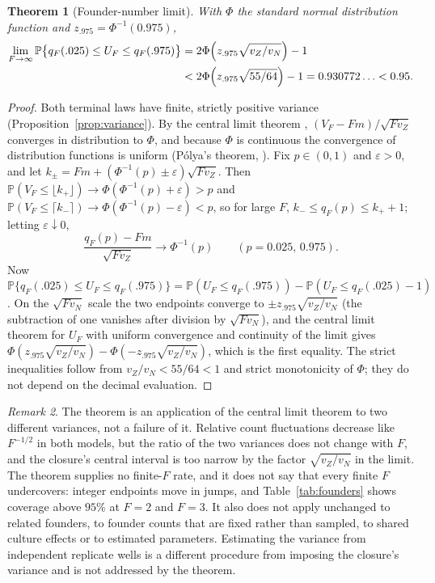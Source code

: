 \documentclass[11pt,a4paper]{article}
\theoremstyle{plain}
\newtheorem{theorem}{Theorem}[section]
\theoremstyle{definition}
\theoremstyle{remark}
\newtheorem{remark}[theorem]{Remark}
\newcommand{\PP}{\mathbb P}
\begin{document}
\begin{theorem}[Founder-number limit]\label{thm:clt}
With $\Phi$ the standard normal distribution function and $z_{.975}=\Phi^{-1}(0.975)$,
\begin{equation}\label{eq:clt}
\begin{aligned}
\lim_{F\to\infty}\PP\bigl\{q_F(.025)\le U_F\le q_F(.975)\bigr\}
&=2\Phi\Bigl(z_{.975}\sqrt{v_Z/v_N}\Bigr)-1\\
&<2\Phi\Bigl(z_{.975}\sqrt{55/64}\Bigr)-1=0.930772\ldots<0.95 .
\end{aligned}
\end{equation}
\end{theorem}
\begin{proof}
Both terminal laws have finite, strictly positive variance (Proposition~\ref{prop:variance}). By the central limit theorem \citep[Chapter~X]{feller1968}, $(V_F-Fm)/\sqrt{Fv_Z}$ converges in distribution to $\Phi$, and because $\Phi$ is continuous the convergence of distribution functions is uniform (P\'olya's theorem, \citealp[Lemma~2.11]{vandervaart1998}). Fix $p\in(0,1)$ and $\varepsilon>0$, and let $k_\pm=Fm+(\Phi^{-1}(p)\pm\varepsilon)\sqrt{Fv_Z}$. Then $\PP(V_F\le\lfloor k_+\rfloor)\to\Phi(\Phi^{-1}(p)+\varepsilon)>p$ and $\PP(V_F\le\lceil k_-\rceil)\to\Phi(\Phi^{-1}(p)-\varepsilon)<p$, so for large $F$, $k_-\le q_F(p)\le k_++1$; letting $\varepsilon\downarrow0$,
\[
\frac{q_F(p)-Fm}{\sqrt{Fv_Z}}\longrightarrow\Phi^{-1}(p)\qquad(p=0.025,\,0.975).
\]
Now $\PP\{q_F(.025)\le U_F\le q_F(.975)\}=\PP(U_F\le q_F(.975))-\PP(U_F\le q_F(.025)-1)$. On the $\sqrt{Fv_N}$ scale the two endpoints converge to $\pm z_{.975}\sqrt{v_Z/v_N}$ (the subtraction of one vanishes after division by $\sqrt{Fv_N}$), and the central limit theorem for $U_F$ with uniform convergence and continuity of the limit gives $\Phi(z_{.975}\sqrt{v_Z/v_N})-\Phi(-z_{.975}\sqrt{v_Z/v_N})$, which is the first equality. The strict inequalities follow from $v_Z/v_N<55/64<1$ and strict monotonicity of $\Phi$; they do not depend on the decimal evaluation.
\end{proof}

\begin{remark}
The theorem is an application of the central limit theorem to two different variances, not a failure of it. Relative count fluctuations decrease like $F^{-1/2}$ in both models, but the ratio of the two variances does not change with $F$, and the closure's central interval is too narrow by the factor $\sqrt{v_Z/v_N}$ in the limit. The theorem supplies no finite-$F$ rate, and it does not say that every finite $F$ undercovers: integer endpoints move in jumps, and Table~\ref{tab:founders} shows coverage above $95\%$ at $F=2$ and $F=3$. It also does not apply unchanged to related founders, to founder counts that are fixed rather than sampled, to shared culture effects or to estimated parameters. Estimating the variance from independent replicate wells is a different procedure from imposing the closure's variance and is not addressed by the theorem.
\end{remark}
\end{document}
